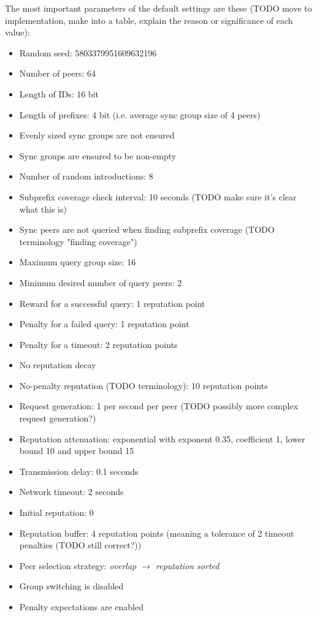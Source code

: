 The most important parameters of the default settings are these (TODO move to
implementation, make into a table, explain the reason or significance of each
value):
\begin{itemize}
\item Random seed: 5803379951609632196
\item Number of peers: 64
\item Length of IDs: 16 bit
\item Length of prefixes: 4 bit (i.e. average sync group size of 4 peers)
\item Evenly sized sync groups are not ensured
\item Sync groups are ensured to be non-empty
\item Number of random introductions: 8
\item Subprefix coverage check interval: 10 seconds (TODO make sure it's clear
      what this is)
\item Sync peers are not queried when finding subprefix coverage (TODO
      terminology "finding coverage")
\item Maximum query group size: 16
\item Minimum desired number of query peers: 2
\item Reward for a successful query: 1 reputation point
\item Penalty for a failed query: 1 reputation point
\item Penalty for a timeout: 2 reputation points
\item No reputation decay
\item No-penalty reputation (TODO terminology): 10 reputation points
\item Request generation: 1 per second per peer (TODO possibly more complex
      request generation?)
\item Reputation attenuation: exponential with exponent 0.35, coefficient 1,
      lower bound 10 and upper bound 15
\item Transmission delay: 0.1 seconds
\item Network timeout: 2 seconds
\item Initial reputation: 0
\item Reputation buffer: 4 reputation points (meaning a tolerance of 2 timeout
      penalties (TODO still correct?))
\item Peer selection strategy: \emph{overlap $\rightarrow$ reputation sorted}
\item Group switching is disabled
\item Penalty expectations are enabled
\end{itemize}

